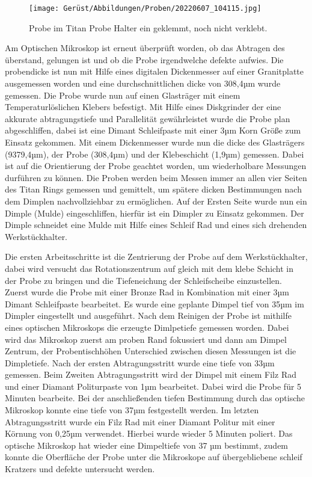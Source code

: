 \begin{figure}[htbp]
 \centering
 \texttt{[image: Gerüst/Abbildungen/Proben/20220607\_104115.jpg]}
 \caption[Probenhalter]{Probe im Titan Probe Halter ein geklemmt, noch nicht verklebt.}
 \label{Probenhalter}
\end{figure}

Am Optischen Mikroskop ist erneut überprüft worden, ob das Abtragen des überstand, gelungen ist und ob die Probe irgendwelche defekte aufwies.
Die probendicke ist nun mit Hilfe eines digitalen Dickenmesser auf einer Granitplatte ausgemessen worden und eine durchschnittlichen dicke von 308,4µm wurde gemessen.
Die Probe wurde nun auf einen Glasträger mit einem Temperaturlöslichen Klebers befestigt.
Mit Hilfe eines Diskgrinder der eine akkurate abtragungstiefe und Parallelität gewährleistet wurde die Probe plan abgeschliffen, dabei ist eine Dimant Schleifpaste mit einer 3µm Korn Größe zum Einsatz gekommen.  
Mit einem Dickenmesser wurde nun die dicke des Glasträgers (9379,4µm), der Probe (308,4µm) und der Klebeschicht (1,9µm) gemessen. Dabei ist auf die Orientierung der Probe geachtet worden, um wiederholbare Messungen durführen zu können. Die Proben werden beim Messen immer an allen vier Seiten des Titan Rings gemessen und gemittelt, um spätere dicken Bestimmungen nach dem Dimplen nachvollziehbar zu ermöglichen.
Auf der Ersten Seite wurde nun ein Dimple (Mulde) eingeschliffen, hierfür ist ein Dimpler zu Einsatz gekommen. Der Dimple schneidet eine Mulde mit Hilfe eines Schleif Rad und eines sich drehenden Werkstückhalter.

Die ersten Arbeitsschritte ist die Zentrierung der Probe auf dem Werkstückhalter, dabei wird versucht das Rotationszentrum auf gleich mit dem klebe Schicht in der Probe zu bringen und die Tiefeneichung der Schleifscheibe einzustellen. 
Zuerst wurde die Probe mit einer Bronze Rad in Kombination mit einer 3µm Dimant Schleifpaste bearbeitet. Es wurde eine geplante Dimpel tief von 35µm im Dimpler eingestellt und ausgeführt.
Nach dem Reinigen der Probe ist mithilfe eines optischen Mikroskops die erzeugte Dimlpetiefe gemessen worden. Dabei wird das Mikroskop zuerst am proben Rand fokussiert und dann am Dimpel Zentrum, der Probentischhöhen Unterschied zwischen diesen Messungen ist die Dimpletiefe. Nach der ersten Abtragungsstritt wurde eine tiefe von 33µm gemessen.
Beim Zweiten Abtragungsstritt wird der Dimpel mit einem Filz Rad und einer Diamant Politurpaste von 1µm bearbeitet. Dabei wird die Probe für 5 Minuten bearbeite.
Bei der anschließenden tiefen Bestimmung durch das optische Mikroskop konnte eine tiefe von 37µm festgestellt werden. 
Im letzten Abtragungsstritt wurde ein Filz Rad mit einer Diamant Politur mit einer Körnung von 0,25µm verwendet. Hierbei wurde wieder 5 Minuten poliert.
Das optische Mikroskop hat wieder eine Dimpeltiefe von 37 µm bestimmt, zudem konnte die Oberfläche der Probe unter die Mikroskope auf übergebliebene schleif Kratzers und defekte untersucht werden.

